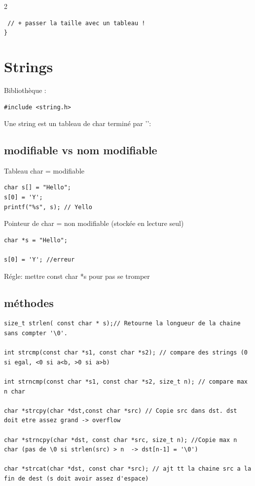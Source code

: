 \documentclass[8pt]{article}
\begin{document}
\begin{multicols}{2}
\begin{lstlisting}
 // + passer la taille avec un tableau ! 
}
\end{lstlisting}
\section{Strings}

Bibliothèque :

\begin{lstlisting}
#include <string.h>
\end{lstlisting}

Une string est un tableau de char terminé par '\0':

\subsection{modifiable vs nom modifiable}
Tableau char = modifiable
\begin{lstlisting}
char s[] = "Hello"; 
s[0] = 'Y';
printf("%s", s); // Yello
\end{lstlisting}

Pointeur de char = non modifiable (stockée en lecture seul)
\begin{lstlisting}
char *s = "Hello";

s[0] = 'Y'; //erreur
\end{lstlisting}
Régle: mettre const char *s pour pas se tromper

\subsection{méthodes}

\begin{lstlisting}
size_t strlen( const char * s);// Retourne la longueur de la chaine sans compter '\0'.

int strcmp(const char *s1, const char *s2); // compare des strings (0 si egal, <0 si a<b, >0 si a>b)

int strncmp(const char *s1, const char *s2, size_t n); // compare max n char

char *strcpy(char *dst,const char *src) // Copie src dans dst. dst doit etre assez grand -> overflow

char *strncpy(char *dst, const char *src, size_t n); //Copie max n char (pas de \0 si strlen(src) > n  -> dst[n-1] = '\0')

char *strcat(char *dst, const char *src); // ajt tt la chaine src a la fin de dest (s doit avoir assez d'espace)


\end{lstlisting}
\end{multicols}
\end{document}
